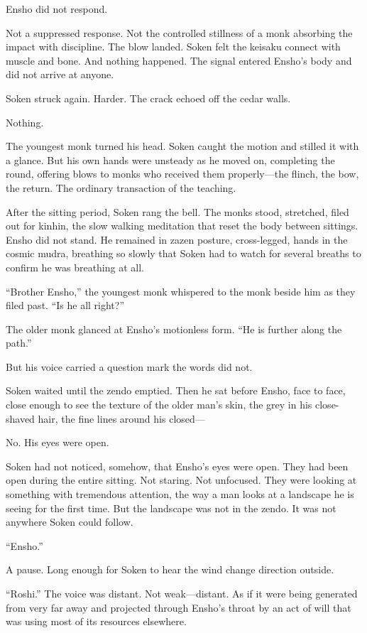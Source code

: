 Ensho did not respond.

Not a suppressed response. Not the controlled stillness of a monk absorbing the impact with discipline. The blow landed. Soken felt the keisaku connect with muscle and bone. And nothing happened. The signal entered Ensho's body and did not arrive at anyone.

Soken struck again. Harder. The crack echoed off the cedar walls.

Nothing.

The youngest monk turned his head. Soken caught the motion and stilled it with a glance. But his own hands were unsteady as he moved on, completing the round, offering blows to monks who received them properly---the flinch, the bow, the return. The ordinary transaction of the teaching.

After the sitting period, Soken rang the bell. The monks stood, stretched, filed out for kinhin, the slow walking meditation that reset the body between sittings. Ensho did not stand. He remained in zazen posture, cross-legged, hands in the cosmic mudra, breathing so slowly that Soken had to watch for several breaths to confirm he was breathing at all.

``Brother Ensho,'' the youngest monk whispered to the monk beside him as they filed past. ``Is he all right?''

The older monk glanced at Ensho's motionless form. ``He is further along the path.''

But his voice carried a question mark the words did not.

Soken waited until the zendo emptied. Then he sat before Ensho, face to face, close enough to see the texture of the older man's skin, the grey in his close-shaved hair, the fine lines around his closed---

No. His eyes were open.

Soken had not noticed, somehow, that Ensho's eyes were open. They had been open during the entire sitting. Not staring. Not unfocused. They were looking at something with tremendous attention, the way a man looks at a landscape he is seeing for the first time. But the landscape was not in the zendo. It was not anywhere Soken could follow.

``Ensho.''

A pause. Long enough for Soken to hear the wind change direction outside.

``Roshi.'' The voice was distant. Not weak---distant. As if it were being generated from very far away and projected through Ensho's throat by an act of will that was using most of its resources elsewhere.

